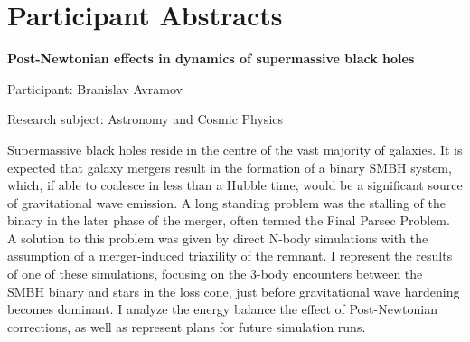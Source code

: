 
\section{Participant Abstracts}

\begin{minipage}[t]{1.0\textwidth}

\begin{center}

{{\large\bfseries Post-Newtonian effects in dynamics of supermassive black holes}\par}

\end{center}

{\noindent Participant: Branislav Avramov\par} 

{\noindent Research subject: Astronomy and Cosmic Physics\par}\medskip

\noindent Supermassive black holes reside in the centre of the vast majority of galaxies. It is expected that galaxy mergers result in the formation of a binary SMBH system, which, if able to coalesce in less than a Hubble time, would be a significant source of gravitational wave emission. A long standing problem was the stalling of the binary in the later phase of the merger, often termed the Final Parsec Problem. A solution to this problem was given by direct N-body simulations with the assumption of a merger-induced triaxility of the remnant. I represent the results of one of these simulations, focusing on the 3-body encounters between the SMBH binary and stars in the loss cone, just before gravitational wave hardening becomes dominant. I analyze the energy balance the effect of Post-Newtonian corrections, as well as represent plans for future simulation runs.  
\par\end{minipage}

\hfill 

